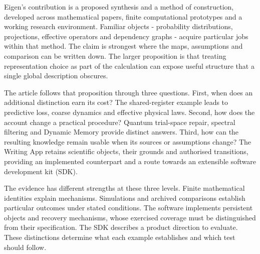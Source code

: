 Eigen's contribution is a proposed synthesis and a method of construction, developed across mathematical papers, finite computational prototypes and a working research environment. Familiar objects - probability distributions, projections, effective operators and dependency graphs - acquire particular jobs within that method. The claim is strongest where the maps, assumptions and comparison can be written down. The larger proposition is that treating representation choice as part of the calculation can expose useful structure that a single global description obscures.

The article follows that proposition through three questions. First, when does an additional distinction earn its cost? The shared-register example leads to predictive loss, coarse dynamics and effective physical laws. Second, how does the account change a practical procedure? Quantum trial-space repair, spectral filtering and Dynamic Memory provide distinct answers. Third, how can the resulting knowledge remain usable when its sources or assumptions change? The Writing App retains scientific objects, their grounds and authorised transitions, providing an implemented counterpart and a route towards an extensible software development kit (SDK).

The evidence has different strengths at these three levels. Finite mathematical identities explain mechanisms. Simulations and archived comparisons establish particular outcomes under stated conditions. The software implements persistent objects and recovery mechanisms, whose exercised coverage must be distinguished from their specification. The SDK describes a product direction to evaluate. These distinctions determine what each example establishes and which test should follow.
